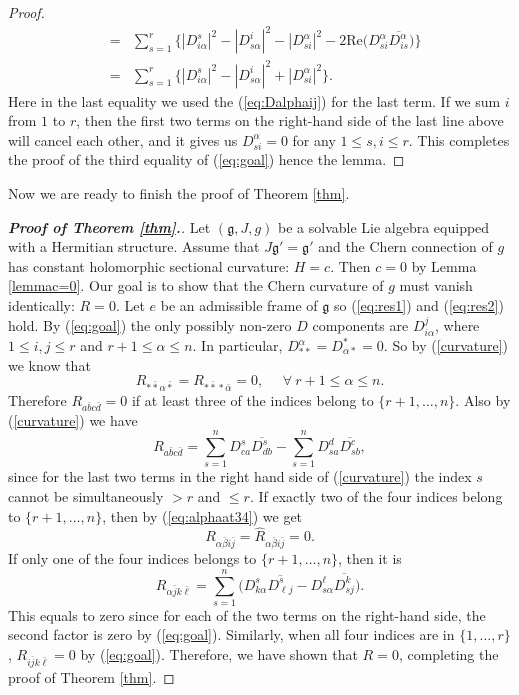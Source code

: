 \documentclass{amsart}
\begin{document}
\begin{proof}
\begin{eqnarray*}
& = & \sum_{s=1}^r  \{  |D^s_{i\alpha}|^2 -  |D^i_{s\alpha}|^2- |D^{\alpha}_{si}|^2 -  2\mbox{Re}  \big( D^{\alpha}_{si}\overline{D^{\alpha}_{is}}  \big) \} \nonumber \\
& = & \sum_{s=1}^r  \{  |D^s_{i\alpha}|^2 -  |D^i_{s\alpha}|^2 + |D^{\alpha}_{si}|^2  \}.
\end{eqnarray*}
Here in the last equality we used the (\ref{eq:Dalphaij}) for the last term. If we sum $i$ from $1$ to $r$, then the first two terms on the right-hand side of the last line above will cancel each other, and it gives us $D^{\alpha}_{si}=0$ for any $1\leq s,i\leq r$. This completes the proof of the third equality of (\ref{eq:goal}) hence the lemma. 
\end{proof}



Now we are ready to finish the proof of Theorem \ref{thm}.

\begin{proof}[{\bf Proof of Theorem \ref{thm}.}]
Let $({\mathfrak g}, J,g)$ be a solvable Lie algebra equipped with a Hermitian structure. Assume that $J{\mathfrak g}'={\mathfrak g}'$ and the Chern connection of $g$ has constant holomorphic sectional curvature: $H=c$. Then $c=0$ by Lemma \ref{lemmac=0}.  Our goal is  to show that the Chern curvature of $g$ must vanish identically: $R=0$. Let $e$ be an admissible frame of ${\mathfrak g}$ so (\ref{eq:res1}) and (\ref{eq:res2}) hold. By (\ref{eq:goal}) the only possibly non-zero $D$ components are $ D^j_{i\alpha}$, where $ 1\leq i,j\leq r$ and $r\!+\!1 \leq \alpha \leq n$. In particular, $D^{\alpha}_{\ast\ast} = D^{\ast}_{\alpha \ast}=0$. So by (\ref{curvature}) we know that
\begin{equation} \label{eq:alphaat34}
 R_{\ast \bar{\ast} \alpha \bar{\ast}} =  R_{\ast \bar{\ast} \ast \bar{\alpha} }=0, \ \ \ \ \ \ \forall \ r\!+\!1 \leq \alpha \leq n. 
 \end{equation}
Therefore $R_{a\bar{b}c\bar{d}}=0$ if at least three of the indices belong to $\{ r\!+\!1, \ldots , n\}$. Also by (\ref{curvature}) we have
$$ R_{a\bar{b}c\bar{d}} = \sum_{s=1}^n D^s_{ca} \overline{D^s_{db} } - \sum_{s=1}^n D^d_{sa} \overline{D^c_{sb} }, $$
since for the last two terms in the right hand side of (\ref{curvature})  the index $s$ cannot be simultaneously $>r$ and $\leq r$. If exactly two of the four indices belong to $\{ r\!+\!1, \ldots , n\}$, then by (\ref{eq:alphaat34}) we get
$$R_{\alpha \bar{\beta}i\bar{j}}=\widehat{R}_{\alpha \bar{\beta}i\bar{j}}=0. $$
If only one of the four indices belongs to $\{ r\!+\!1, \ldots , n\}$, then it is
$$R_{\alpha \bar{j}k\bar{\ell}}=   \sum_{s=1}^n \big( D^s_{k\alpha } \overline{D^s_{\ell j} } -  D^{\ell}_{s\alpha } \overline{D^k_{sj} }\big).$$
This equals to zero since for each of the two terms on the right-hand side, the second factor is zero by (\ref{eq:goal}). Similarly, when all four indices are in $\{ 1, \ldots , r\}$, $R_{i\bar{j}k\bar{\ell}}=0$ by (\ref{eq:goal}). Therefore, we have shown that $R=0$, completing the proof of Theorem \ref{thm}.
 \end{proof}
\end{document}
